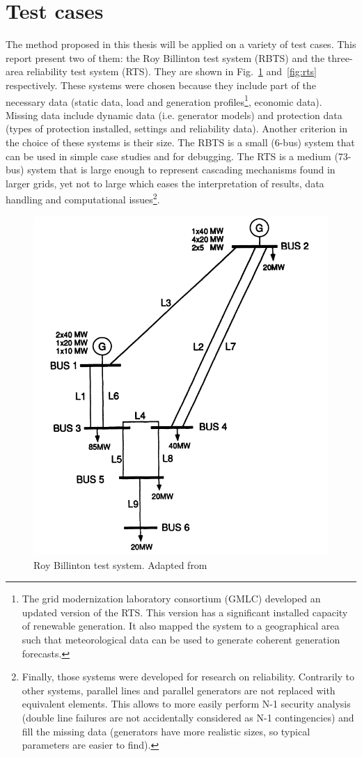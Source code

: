 
\section{Test cases}
\label{sec:testCases}

The method proposed in this thesis will be applied on a variety of test cases. This report present two of them: the Roy Billinton test system (RBTS) and the three-area reliability test system (RTS). They are shown in Fig.~\ref{fig:rbts-ch6} and~\ref{fig:rts} respectively. These systems were chosen because they include part of the necessary data (static data, load and generation profiles\footnote{The grid modernization laboratory consortium (GMLC) developed an updated version of the RTS. This version has a significant installed capacity of renewable generation. It also mapped the system to a geographical area such that meteorological data can be used to generate coherent generation forecasts.}, economic data). Missing data include dynamic data (i.e. generator models) and protection data (types of protection installed, settings and reliability data). Another criterion in the choice of these systems is their size. The RBTS is a small (6-bus) system that can be used in simple case studies and for debugging. The RTS is a medium (73-bus) system that is large enough to represent cascading mechanisms found in larger grids, yet not to large which eases the interpretation of results, data handling and computational issues\footnote{Finally, those systems were developed for research on reliability. Contrarily to other systems, parallel lines and parallel generators are not replaced with equivalent elements. This allows to more easily perform N-1 security analysis (double line failures are not accidentally considered as N-1 contingencies) and fill the missing data (generators have more realistic sizes, so typical parameters are easier to find).}.

\begin{figure}
    \centering
    \includegraphics[width=0.6\linewidth]{Figs/RBTS.png}
    \caption{Roy Billinton test system. Adapted from~\cite{rbts}}
    \label{fig:rbts-ch6}
\end{figure}

